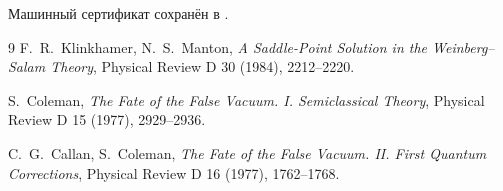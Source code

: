 Машинный сертификат сохранён в
.

\begin{thebibliography}{9}
F.~R.~Klinkhamer, N.~S.~Manton,
\emph{A Saddle-Point Solution in the Weinberg--Salam Theory},
Physical Review D 30 (1984), 2212--2220.

S.~Coleman, \emph{The Fate of the False Vacuum. I. Semiclassical Theory},
Physical Review D 15 (1977), 2929--2936.

C.~G.~Callan, S.~Coleman,
\emph{The Fate of the False Vacuum. II. First Quantum Corrections},
Physical Review D 16 (1977), 1762--1768.
\end{thebibliography}